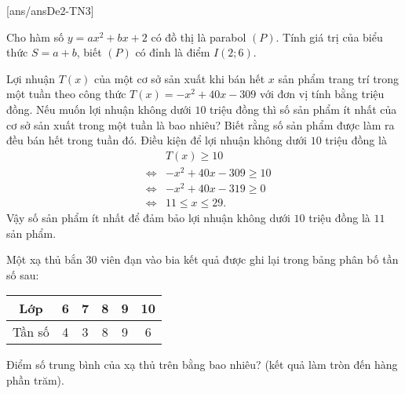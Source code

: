 \TNSA
{}[ans/ansDe2-TN3]
\begin{ex}%
	Cho hàm số $y=ax^2+bx+2$ có đồ thị là parabol $(P)$. Tính giá trị của biểu thức $S=a+b$, biết $(P)$ có đỉnh là điểm $I(2;6)$.
\end{ex}

\begin{ex}%
	Lợi nhuận $T(x)$ của một cơ sở sản xuất khi bán hết $x$ sản phẩm trang trí trong một tuần theo công thức $T(x)=-x^2+40x-309$ với đơn vị tính bằng triệu đồng. Nếu muốn lợi nhuận không dưới $10$ triệu đồng thì số sản phẩm ít nhất của cơ sở sản xuất trong một tuần là bao nhiêu? Biết rằng số sản phẩm được làm ra đều bán hết trong tuần đó.
	\loigiai
	{
		Điều kiện để lợi nhuận không dưới $10$ triệu đồng là
		\begin{eqnarray*}
			& & T(x) \geq 10\\
			& \Leftrightarrow & -x^2+40x-309 \geq 10\\
			& \Leftrightarrow & -x^2+40x-319 \geq 0\\
			& \Leftrightarrow & 11 \leq x \leq 29.
		\end{eqnarray*}
		Vậy số sản phẩm ít nhất để đảm bảo lợi nhuận không dưới $10$ triệu đồng là $11$ sản phẩm.
	}
\end{ex}

\begin{ex}%
	Một xạ thủ bắn 30 viên đạn vào bia kết quả được ghi lại trong bảng phân bố tần số sau:
	\begin{center}
		\begin{tabular}{|c|c|c|c|c|c|}
			\hline
			Lớp    & 6 & 7 & 8 & 9 & 10 \\
			\hline
			Tần số & 4 & 3 & 8 & 9 & 6  \\
			\hline
		\end{tabular}
	\end{center}
	Điểm số trung bình của xạ thủ trên bằng bao nhiêu? (kết quả làm tròn đến hàng phần trăm).
\end{ex}

